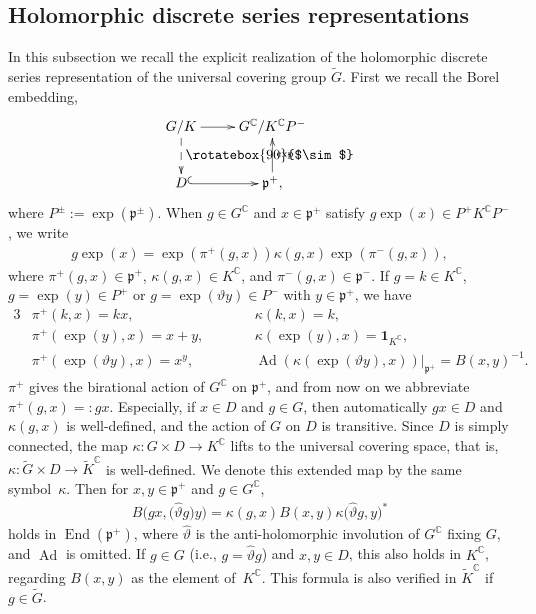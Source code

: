\documentclass[pdftex]{sigma}
\numberwithin{equation}{section}
\newcommand{\bone}{\mathbf{1}}
\newcommand{\BC}{\mathbb{C}}
\newcommand{\fp}{\mathfrak{p}}
\newcommand{\End}{\operatorname{End}}
\begin{document}
\subsection{Holomorphic discrete series representations}\label{HDS}
In this subsection we recall the explicit realization of the holomorphic discrete series representation
of the universal covering group $\tilde{G}$. First we recall the Borel embedding,
\begin{gather*} \xymatrix{ G/K \ar[r] \ar@{-->}[d]^{\mbox{\rotatebox{90}{$\sim$}}} & G^\BC/K^\BC P^- \\
 D \ar@{^{(}->}[r] & \fp^+, \ar[u]_{\exp} } \end{gather*}
where $P^\pm:=\exp(\fp^\pm)$. When $g\in G^\BC$ and $x\in \fp^+$ satisfy $g\exp(x)\in P^+K^\BC P^-$, we write
\begin{gather}\label{cocycle}
g\exp(x)=\exp(\pi^+(g,x))\kappa(g,x)\exp(\pi^-(g,x)),
\end{gather}
where $\pi^+(g,x)\in\fp^+$, $\kappa(g,x)\in K^\BC$, and $\pi^-(g,x)\in\fp^-$.
If $g=k\in K^\BC$, $g=\exp(y)\in P^+$ or $g=\exp(\vartheta y)\in P^-$ with $y\in\fp^+$, we have
\begin{alignat*}{3}
&\pi^+(k,x)=kx,\qquad && \kappa(k,x)=k,&\\
& \pi^+(\exp(y),x)=x+y,\qquad && \kappa(\exp(y),x) =\bone_{K^\BC},& \\
& \pi^+(\exp(\vartheta y),x) =x^y,\qquad && \operatorname{Ad}(\kappa(\exp(\vartheta y),x))|_{\fp^+}=B(x,y)^{-1}.&
\end{alignat*}
$\pi^+$ gives the birational action of $G^\BC$ on $\fp^+$, and from now on we abbreviate $\pi^+(g,x)=:gx$.
Especially, if $x\in D$ and $g\in G$, then automatically $gx\in D$ and $\kappa(g,x)$ is well-defined,
and the action of $G$ on $D$ is transitive. Since $D$ is simply connected, the map $\kappa\colon G\times D\to K^\BC$
lifts to the universal covering space, that is, $\kappa\colon \tilde{G}\times D\to \tilde{K}^\BC$ is well-defined.
We denote this extended map by the same symbol~$\kappa$. Then for $x,y\in\fp^+$ and $g\in G^\BC$,
\begin{gather}\label{Bergman_property}
B\big(gx,\big(\hat{\vartheta}g\big)y\big)=\kappa(g,x)B(x,y)\kappa\big(\hat{\vartheta}g,y\big)^*
\end{gather}
holds in $\End(\fp^+)$, where $\hat{\vartheta}$ is the anti-holomorphic involution of $G^\BC$ fixing $G$, and $\operatorname{Ad}$ is omitted.
If $g\in G$ (i.e., $g=\hat{\vartheta}g$) and $x,y\in D$, this also holds in $K^\BC$, regarding $B(x,y)$ as the element of~$K^\BC$.
This formula is also verified in $\tilde{K}^\BC$ if $g\in \tilde{G}$.
\end{document}
